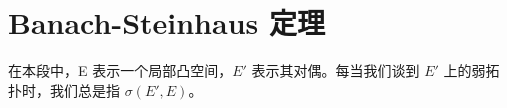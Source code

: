 \section{Banach-Steinhaus 定理}

在本段中，E 表示一个局部凸空间，\(E'\) 表示其对偶。每当我们谈到 \(E'\) 上的弱拓扑时，我们总是指 \(\sigma(E', E)\)。

